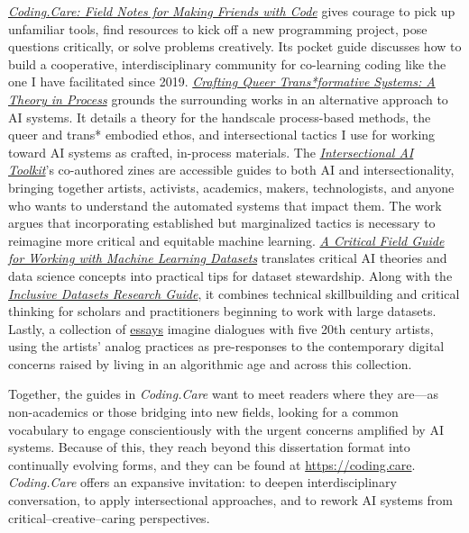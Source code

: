 \emph{\href{https://coding.care/guide.html}{Coding.Care: Field Notes for
Making Friends with Code}} gives courage to pick up unfamiliar tools,
find resources to kick off a new programming project, pose questions
critically, or solve problems creatively. Its pocket guide discusses how
to build a cooperative, interdisciplinary community for co-learning
coding like the one I have facilitated since 2019.
\emph{\href{https://coding.care/transform.html}{Crafting Queer
Trans*formative Systems: A Theory in Process}} grounds the surrounding
works in an alternative approach to AI systems. It details a theory for
the handscale process-based methods, the queer and trans* embodied
ethos, and intersectional tactics I use for working toward AI systems as
crafted, in-process materials. The
\emph{\href{https://intersectionalai.com}{Intersectional AI Toolkit}}'s
co-authored zines are accessible guides to both AI and
intersectionality, bringing together artists, activists, academics,
makers, technologists, and anyone who wants to understand the automated
systems that impact them. The work argues that incorporating established
but marginalized tactics is necessary to reimagine more critical and
equitable machine learning.
\emph{\href{https://knowingmachines.org/critical-field-guide}{A Critical
Field Guide for Working with Machine Learning Datasets}} translates
critical AI theories and data science concepts into practical tips for
dataset stewardship. Along with the
\emph{\href{https://libguides.usc.edu/inclusive-datasets}{Inclusive
Datasets Research Guide}}, it combines technical skillbuilding and
critical thinking for scholars and practitioners beginning to work with
large datasets. Lastly, a collection of
\href{https://coding.care}{essays} imagine dialogues with five 20th
century artists, using the artists' analog practices as pre-responses to
the contemporary digital concerns raised by living in an algorithmic age
and across this collection.

Together, the guides in \emph{Coding.Care} want to meet readers where
they are---as non-academics or those bridging into new fields, looking
for a common vocabulary to engage conscientiously with the urgent
concerns amplified by AI systems. Because of this, they reach beyond
this dissertation format into continually evolving forms, and they can
be found at \url{https://coding.care}. \emph{Coding.Care} offers an
expansive invitation: to deepen interdisciplinary conversation, to apply
intersectional approaches, and to rework AI systems from
critical--creative--caring perspectives.
